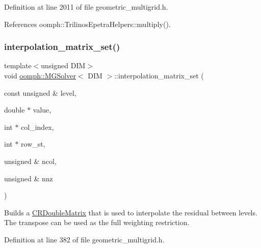 Definition at line 2011 of file geometric\+\_\+multigrid.\+h.



References oomph\+::\+Trilinos\+Epetra\+Helpers\+::multiply().

\mbox{\label{classoomph_1_1MGSolver_ad749205517822b5855faab5701f90afe}} 
\subsubsection{\texorpdfstring{interpolation\+\_\+matrix\+\_\+set()}{interpolation\_matrix\_set()}\hspace{0.1cm}{\footnotesize\ttfamily [1/2]}}
{\footnotesize\ttfamily template$<$unsigned D\+IM$>$ \\
void \hyperlink{classoomph_1_1MGSolver}{oomph\+::\+M\+G\+Solver}$<$ D\+IM $>$\+::interpolation\+\_\+matrix\+\_\+set (\begin{DoxyParamCaption}\item[{const unsigned \&}]{level,  }\item[{double $\ast$}]{value,  }\item[{int $\ast$}]{col\+\_\+index,  }\item[{int $\ast$}]{row\+\_\+st,  }\item[{unsigned \&}]{ncol,  }\item[{unsigned \&}]{nnz }\end{DoxyParamCaption})\hspace{0.3cm}{\ttfamily [inline]}}



Builds a \hyperlink{classoomph_1_1CRDoubleMatrix}{C\+R\+Double\+Matrix} that is used to interpolate the residual between levels. The transpose can be used as the full weighting restriction. 



Definition at line 382 of file geometric\+\_\+multigrid.\+h.

\mbox{\label{classoomph_1_1MGSolver_a7f96b229fb357fdf817f790f92197745}} 
